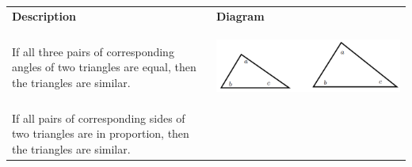        \begin{center}
      \label{m39368*id318196}
    \noindent
      \tablelasttail{}
      \begin{xtabular*}{\mytablewidth}[t]{|p{10\mystarwidth}|p{10\mystarwidth}|}\hline
                    \textbf{Description}
                   &
                    \textbf{Diagram}
     \tabularnewline{}
        If all three pairs of corresponding angles of two triangles are equal, then the triangles are similar. &
    \setcounter{subfigure}{0}
\label{m39368*id318251}
    \begin{center}
    \label{m39368*id318251!!!underscore!!!media}\label{m39368*id318251!!!underscore!!!printimage}\includegraphics[width=.25\columnwidth]{col11306.imgs/m39368_MG10C13_035.png} %
      \vspace{2pt}
    \vspace{.1in}
    \end{center}    
     \tabularnewline{}
        If all pairs of corresponding sides of two triangles are in proportion, then the triangles are similar. &

\end{xtabular*}
\end{center}
